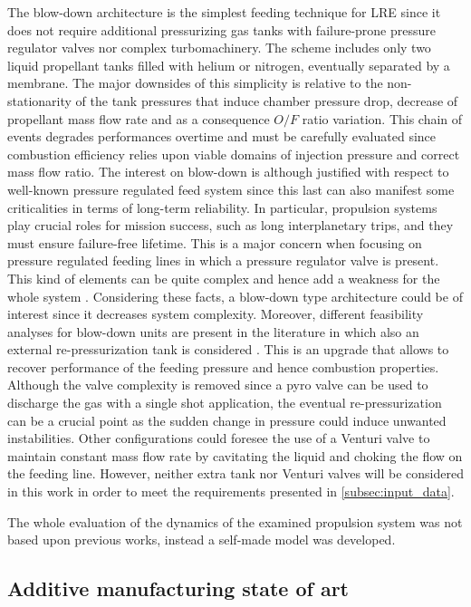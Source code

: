 The blow-down architecture is the simplest feeding technique for LRE since it does not require additional pressurizing gas tanks with failure-prone pressure regulator valves nor complex turbomachinery. The scheme includes only two liquid propellant tanks filled with helium or nitrogen, eventually separated by a membrane.
The major downsides of this simplicity is relative to the non-stationarity of the tank pressures that induce chamber pressure drop, decrease of propellant mass flow rate  and as a consequence $O/F$ ratio variation. This chain of events degrades performances overtime and must be carefully evaluated since combustion efficiency relies upon viable domains of injection pressure and correct mass flow ratio.
The interest on blow-down is although justified with respect to well-known pressure regulated feed system since this last can also manifest some criticalities in terms of long-term reliability. In particular, propulsion systems play crucial roles for mission success, such as long interplanetary trips, and they must ensure failure-free lifetime.
This is a major concern when focusing on pressure regulated feeding lines in which a pressure regulator valve is present. This kind of elements can be quite complex and hence add a weakness for the whole system \cite{valve_criticalities}.
Considering these facts, a blow-down type architecture could be of interest since it decreases system complexity. Moreover, different feasibility analyses for blow-down units are present in the literature in which also an external re-pressurization tank is considered \cite{repressurization}.
This is an upgrade that allows to recover performance of the feeding pressure and hence combustion properties. Although the valve complexity is removed since a pyro valve can be used to discharge the gas with a single shot application, the eventual re-pressurization can be a crucial point as the sudden change in pressure could induce unwanted instabilities.
Other configurations could foresee the use of a Venturi valve to maintain constant mass flow rate by cavitating the liquid and choking the flow on the feeding line. However, neither extra tank nor Venturi valves will be considered in this work in order to meet the requirements presented in \autoref{subsec:input_data}.

The whole evaluation of the dynamics of the examined propulsion system was not based upon previous works, instead a self-made model was developed.

\subsection{Additive manufacturing state of art}
\label{subsec:additive_intro}

